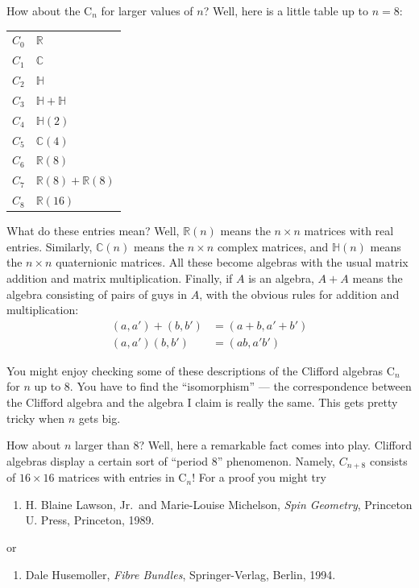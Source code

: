 \documentclass{article}
\def\tightlist{}
\begin{document}
How about the \(\mathrm{C}_n\) for larger values of \(n\)? Well, here is
a little table up to \(n = 8\):

\begin{longtable}[]{@{}rl@{}}
\toprule
\endhead
\(C_0\) & \(\mathbb{R}\)\tabularnewline
\(C_1\) & \(\mathbb{C}\)\tabularnewline
\(C_2\) & \(\mathbb{H}\)\tabularnewline
\(C_3\) & \(\mathbb{H}+\mathbb{H}\)\tabularnewline
\(C_4\) & \(\mathbb{H}(2)\)\tabularnewline
\(C_5\) & \(\mathbb{C}(4)\)\tabularnewline
\(C_6\) & \(\mathbb{R}(8)\)\tabularnewline
\(C_7\) & \(\mathbb{R}(8)+\mathbb{R}(8)\)\tabularnewline
\(C_8\) & \(\mathbb{R}(16)\)\tabularnewline
\bottomrule
\end{longtable}

What do these entries mean? Well, \(\mathbb{R}(n)\) means the
\(n\times n\) matrices with real entries. Similarly, \(\mathbb{C}(n)\)
means the \(n\times n\) complex matrices, and \(\mathbb{H}(n)\) means
the \(n\times n\) quaternionic matrices. All these become algebras with
the usual matrix addition and matrix multiplication. Finally, if \(A\)
is an algebra, \(A + A\) means the algebra consisting of pairs of guys
in \(A\), with the obvious rules for addition and multiplication: \[
  \begin{aligned}
    (a, a') + (b, b') &= (a + b, a' + b')
  \\(a, a') (b, b') &= (ab, a'b')
  \end{aligned}
\]

You might enjoy checking some of these descriptions of the Clifford
algebras \(\mathrm{C}_n\) for \(n\) up to 8. You have to find the
``isomorphism'' --- the correspondence between the Clifford algebra and
the algebra I claim is really the same. This gets pretty tricky when
\(n\) gets big.

How about \(n\) larger than 8? Well, here a remarkable fact comes into
play. Clifford algebras display a certain sort of ``period 8''
phenomenon. Namely, \(C_{n+8}\) consists of \(16\times 16\) matrices
with entries in \(\mathrm{C}_n\)! For a proof you might try

\begin{enumerate}
\def\labelenumi{\arabic{enumi})}
\setcounter{enumi}{1}
\tightlist
\item
  H. Blaine Lawson, Jr.~and Marie-Louise Michelson, \emph{Spin
  Geometry}, Princeton U. Press, Princeton, 1989.
\end{enumerate}

or

\begin{enumerate}
\def\labelenumi{\arabic{enumi})}
\setcounter{enumi}{2}
\tightlist
\item
  Dale Husemoller, \emph{Fibre Bundles}, Springer-Verlag, Berlin, 1994.
\end{enumerate}
\end{document}
